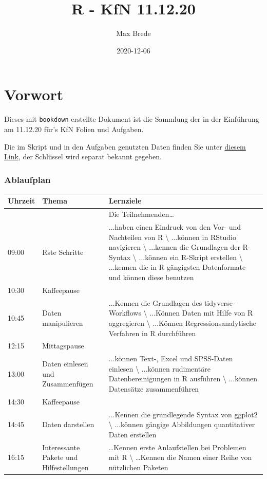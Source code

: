 \documentclass[
]{book}
\title{R - KfN 11.12.20}
\author{Max Brede}
\date{2020-12-06}
\begin{document}
\maketitle

{
\setcounter{tocdepth}{1}
\tableofcontents
}
\hypertarget{vorwort}{%
\chapter{Vorwort}\label{vorwort}}

Dieses mit \texttt{bookdown} erstellte Dokument ist die Sammlung der in der Einführung am 11.12.20 für's KfN Folien und Aufgaben.

Die im Skript und in den Aufgaben genutzten Daten finden Sie unter \href{https://mega.nz/folder/k2A0WZAZ}{diesem Link}, der Schlüssel wird separat bekannt gegeben.

\hypertarget{ablaufplan}{%
\subsection{Ablaufplan}\label{ablaufplan}}

\begin{tabular}{l|l|l}
\hline
Uhrzeit & Thema & Lernziele\\
\hline
 &  & Die Teilnehmenden…\\
\hline
09:00 & Rste Schritte & ...haben einen Eindruck von den Vor- und Nachteilen von R \textbackslash{}
 ...können in RStudio navigieren \textbackslash{}
 ...kennen die Grundlagen der R-Syntax \textbackslash{}
 ...können ein R-Skript erstellen \textbackslash{}
 ...kennen die in R gängigsten Datenformate und können diese benutzen\\
\hline
10:30 & Kaffeepause & \\
\hline
10:45 & Daten manipulieren & ...Kennen die Grundlagen des tidyverse-Workflows \textbackslash{}
 ...Können Daten mit Hilfe von R aggregieren \textbackslash{}
 ...Können Regressionsanalytische Verfahren in R durchführen\\
\hline
12:15 & Mittagspause & \\
\hline
13:00 & Daten einlesen und Zusammenfügen & ...können Text-, Excel und SPSS-Daten einlesen \textbackslash{}
 ...können rudimentäre Datenbereinigungen in R ausführen \textbackslash{}
 ...können Datensätze zusammenführen\\
\hline
14:30 & Kaffeepause & \\
\hline
14:45 & Daten darstellen & ...Kennen die grundlegende Syntax von ggplot2 \textbackslash{}
 ...können gängige Abbildungen quantitativer Daten erstellen\\
\hline
16:15 & Interessante Pakete und Hilfestellungen & …Kennen erste Anlaufstellen bei Problemen mit R \textbackslash{}
 …Kennen die Namen einer Reihe von nützlichen Paketen\\
\hline
\end{tabular}
\end{document}
